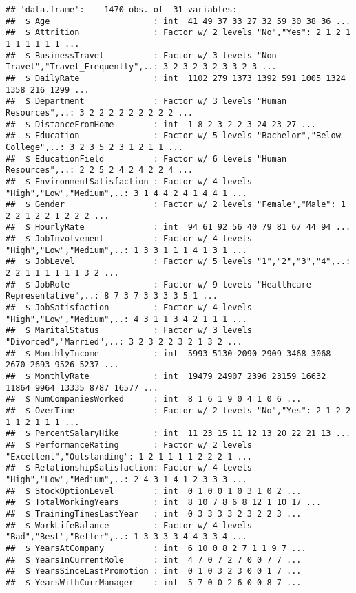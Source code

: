 \documentclass[]{article}
\begin{document}
\begin{verbatim}
## 'data.frame':    1470 obs. of  31 variables:
##  $ Age                     : int  41 49 37 33 27 32 59 30 38 36 ...
##  $ Attrition               : Factor w/ 2 levels "No","Yes": 2 1 2 1 1 1 1 1 1 1 ...
##  $ BusinessTravel          : Factor w/ 3 levels "Non-Travel","Travel_Frequently",..: 3 2 3 2 3 2 3 3 2 3 ...
##  $ DailyRate               : int  1102 279 1373 1392 591 1005 1324 1358 216 1299 ...
##  $ Department              : Factor w/ 3 levels "Human Resources",..: 3 2 2 2 2 2 2 2 2 2 ...
##  $ DistanceFromHome        : int  1 8 2 3 2 2 3 24 23 27 ...
##  $ Education               : Factor w/ 5 levels "Bachelor","Below College",..: 3 2 3 5 2 3 1 2 1 1 ...
##  $ EducationField          : Factor w/ 6 levels "Human Resources",..: 2 2 5 2 4 2 4 2 2 4 ...
##  $ EnvironmentSatisfaction : Factor w/ 4 levels "High","Low","Medium",..: 3 1 4 4 2 4 1 4 4 1 ...
##  $ Gender                  : Factor w/ 2 levels "Female","Male": 1 2 2 1 2 2 1 2 2 2 ...
##  $ HourlyRate              : int  94 61 92 56 40 79 81 67 44 94 ...
##  $ JobInvolvement          : Factor w/ 4 levels "High","Low","Medium",..: 1 3 3 1 1 1 4 1 3 1 ...
##  $ JobLevel                : Factor w/ 5 levels "1","2","3","4",..: 2 2 1 1 1 1 1 1 3 2 ...
##  $ JobRole                 : Factor w/ 9 levels "Healthcare Representative",..: 8 7 3 7 3 3 3 3 5 1 ...
##  $ JobSatisfaction         : Factor w/ 4 levels "High","Low","Medium",..: 4 3 1 1 3 4 2 1 1 1 ...
##  $ MaritalStatus           : Factor w/ 3 levels "Divorced","Married",..: 3 2 3 2 2 3 2 1 3 2 ...
##  $ MonthlyIncome           : int  5993 5130 2090 2909 3468 3068 2670 2693 9526 5237 ...
##  $ MonthlyRate             : int  19479 24907 2396 23159 16632 11864 9964 13335 8787 16577 ...
##  $ NumCompaniesWorked      : int  8 1 6 1 9 0 4 1 0 6 ...
##  $ OverTime                : Factor w/ 2 levels "No","Yes": 2 1 2 2 1 1 2 1 1 1 ...
##  $ PercentSalaryHike       : int  11 23 15 11 12 13 20 22 21 13 ...
##  $ PerformanceRating       : Factor w/ 2 levels "Excellent","Outstanding": 1 2 1 1 1 1 2 2 2 1 ...
##  $ RelationshipSatisfaction: Factor w/ 4 levels "High","Low","Medium",..: 2 4 3 1 4 1 2 3 3 3 ...
##  $ StockOptionLevel        : int  0 1 0 0 1 0 3 1 0 2 ...
##  $ TotalWorkingYears       : int  8 10 7 8 6 8 12 1 10 17 ...
##  $ TrainingTimesLastYear   : int  0 3 3 3 3 2 3 2 2 3 ...
##  $ WorkLifeBalance         : Factor w/ 4 levels "Bad","Best","Better",..: 1 3 3 3 3 4 4 3 3 4 ...
##  $ YearsAtCompany          : int  6 10 0 8 2 7 1 1 9 7 ...
##  $ YearsInCurrentRole      : int  4 7 0 7 2 7 0 0 7 7 ...
##  $ YearsSinceLastPromotion : int  0 1 0 3 2 3 0 0 1 7 ...
##  $ YearsWithCurrManager    : int  5 7 0 0 2 6 0 0 8 7 ...
\end{verbatim}
\end{document}

